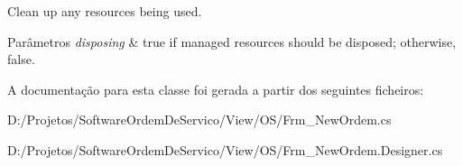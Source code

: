 Clean up any resources being used. 


\begin{DoxyParams}{Parâmetros}
{\em disposing} & true if managed resources should be disposed; otherwise, false.\\
\hline
\end{DoxyParams}


A documentação para esta classe foi gerada a partir dos seguintes ficheiros\+:\begin{DoxyCompactItemize}
\item 
D\+:/\+Projetos/\+Software\+Ordem\+De\+Servico/\+View/\+O\+S/Frm\+\_\+\+New\+Ordem.\+cs\item 
D\+:/\+Projetos/\+Software\+Ordem\+De\+Servico/\+View/\+O\+S/Frm\+\_\+\+New\+Ordem.\+Designer.\+cs\end{DoxyCompactItemize}
